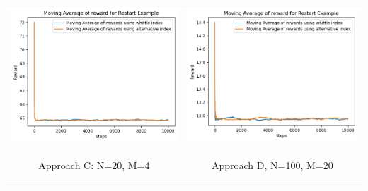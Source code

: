\documentclass{slides}
\begin{document}
{{\begin{center}
\begin{tabular}{cc}
\includegraphics[scale=0.6]{homo_restart_compariosn_C.png} &
\includegraphics[scale=0.6]{comparison_homo_restart_D.png} \\
\begin{small}
 Approach C: N=20, M=4\end{small} & \begin{small}Approach D, N=100, M=20\end{small}\\
 \end{tabular}

\end{center}
    
}}
\end{document}
